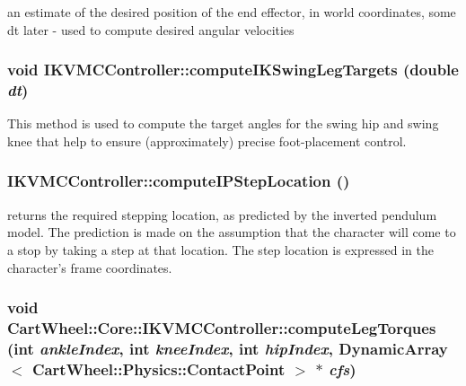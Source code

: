 \begin{DoxyItemize}
\item an estimate of the desired position of the end effector, in world coordinates, some dt later -\/ used to compute desired angular velocities 
\end{DoxyItemize}\hypertarget{classCartWheel_1_1Core_1_1IKVMCController_a02acf83feb698c0e35a81db2c5b8b788}{
\subsubsection[{computeIKSwingLegTargets}]{\setlength{\rightskip}{0pt plus 5cm}void IKVMCController::computeIKSwingLegTargets (double {\em dt})}}
\label{classCartWheel_1_1Core_1_1IKVMCController_a02acf83feb698c0e35a81db2c5b8b788}
This method is used to compute the target angles for the swing hip and swing knee that help to ensure (approximately) precise foot-\/placement control. \hypertarget{classCartWheel_1_1Core_1_1IKVMCController_a0fe1ad56b05f7b16ed0f3b7421056b4b}{
\subsubsection[{computeIPStepLocation}]{ IKVMCController::computeIPStepLocation ()}}
\label{classCartWheel_1_1Core_1_1IKVMCController_a0fe1ad56b05f7b16ed0f3b7421056b4b}
returns the required stepping location, as predicted by the inverted pendulum model. The prediction is made on the assumption that the character will come to a stop by taking a step at that location. The step location is expressed in the character's frame coordinates. \hypertarget{classCartWheel_1_1Core_1_1IKVMCController_af111c60309fbcb6bd5da03ac95b984f4}{
\subsubsection[{computeLegTorques}]{\setlength{\rightskip}{0pt plus 5cm}void CartWheel::Core::IKVMCController::computeLegTorques (int {\em ankleIndex}, \/  int {\em kneeIndex}, \/  int {\em hipIndex}, \/  DynamicArray$<$ {\bf CartWheel::Physics::ContactPoint} $>$ $\ast$ {\em cfs})}}
